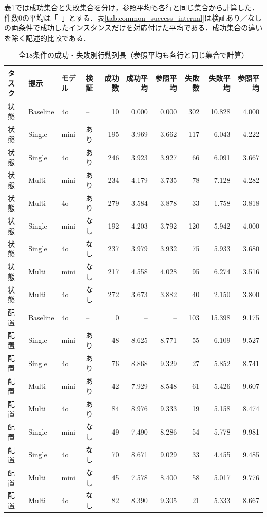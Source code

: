 表\ref{tab:all_outcome_lengths}では成功集合と失敗集合を分け，参照平均も各行と同じ集合から計算した．件数0の平均は「--」とする．表\ref{tab:common_success_internal}は検証あり／なしの両条件で成功したインスタンスだけを対応付けた平均である．成功集合の違いを除く記述的比較である．
\begin{table}[tb]
\caption{全18条件の成功・失敗別行動列長（参照平均も各行と同じ集合で計算）}\label{tab:all_outcome_lengths}
\centering\small
\setlength{\tabcolsep}{3pt}
\begin{tabular}{llllrrrrrr}
\hline
タスク & 提示 & モデル & 検証 & 成功数 & 成功平均 & 参照平均 & 失敗数 & 失敗平均 & 参照平均 \\
\hline
状態 & Baseline & 4o & -- & 10 & 0.000 & 0.000 & 302 & 10.828 & 4.000 \\
状態 & Single & mini & あり & 195 & 3.969 & 3.662 & 117 & 6.043 & 4.222 \\
状態 & Single & 4o & あり & 246 & 3.923 & 3.927 & 66 & 6.091 & 3.667 \\
状態 & Multi & mini & あり & 234 & 4.179 & 3.735 & 78 & 7.128 & 4.282 \\
状態 & Multi & 4o & あり & 279 & 3.584 & 3.878 & 33 & 1.758 & 3.818 \\
状態 & Single & mini & なし & 192 & 4.203 & 3.792 & 120 & 5.942 & 4.000 \\
状態 & Single & 4o & なし & 237 & 3.979 & 3.932 & 75 & 5.933 & 3.680 \\
状態 & Multi & mini & なし & 217 & 4.558 & 4.028 & 95 & 6.274 & 3.516 \\
状態 & Multi & 4o & なし & 272 & 3.673 & 3.882 & 40 & 2.150 & 3.800 \\
配置 & Baseline & 4o & -- & 0 & -- & -- & 103 & 15.398 & 9.175 \\
配置 & Single & mini & あり & 48 & 8.625 & 8.771 & 55 & 6.109 & 9.527 \\
配置 & Single & 4o & あり & 76 & 8.868 & 9.329 & 27 & 5.852 & 8.741 \\
配置 & Multi & mini & あり & 42 & 7.929 & 8.548 & 61 & 5.426 & 9.607 \\
配置 & Multi & 4o & あり & 84 & 8.976 & 9.333 & 19 & 5.158 & 8.474 \\
配置 & Single & mini & なし & 49 & 7.490 & 8.286 & 54 & 5.778 & 9.981 \\
配置 & Single & 4o & なし & 70 & 8.671 & 9.029 & 33 & 4.455 & 9.485 \\
配置 & Multi & mini & なし & 45 & 7.578 & 8.400 & 58 & 5.017 & 9.776 \\
配置 & Multi & 4o & なし & 82 & 8.390 & 9.305 & 21 & 5.333 & 8.667 \\
\hline
\end{tabular}
\end{table}
